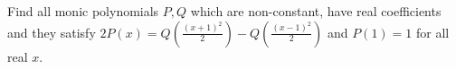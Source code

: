 Find all monic polynomials $P,Q$ which are non-constant, have real coefficients and they satisfy $2P(x)=Q(\frac{(x+1)^2}{2})-Q(\frac{(x-1)^2}{2})$ and $P(1)=1$ for all real $x$.